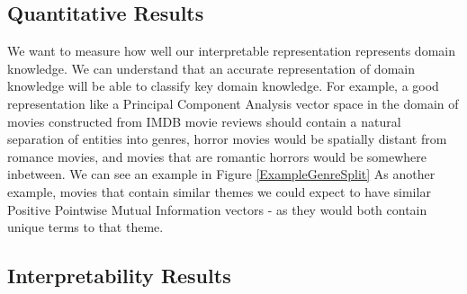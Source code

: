

\subsection{Quantitative Results}

We want to measure how well our interpretable representation represents domain knowledge. We can understand that an accurate representation of domain knowledge will be able to classify key domain knowledge. For example, a good representation like a Principal Component Analysis vector space in the domain of movies constructed from IMDB movie reviews should contain a natural separation of entities into genres, horror movies would be spatially distant from romance movies, and movies that are romantic horrors would be somewhere inbetween. We can see an example in Figure \ref{ExampleGenreSplit} As another example, movies that contain similar themes we could expect to have similar Positive Pointwise Mutual Information vectors - as they would both contain unique terms to that theme.


\subsection{Interpretability Results}
